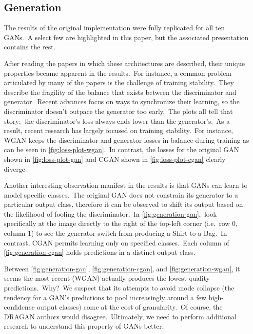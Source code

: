 \documentclass[conference]{IEEEtran}
\begin{document}
    \subsection{Generation}\label{subsec:results-generation}

    The results of the original implementation were fully replicated for all ten GANs.\ A select few are highlighted in this paper, but the associated presentation contains the rest.

    After reading the papers in which these architectures are described, their unique properties became apparent in the results.\ For instance, a common problem articulated by many of the papers is the challenge of training stability.\ They describe the fragility of the balance that exists between the discriminator and generator.\ Recent advances focus on ways to synchronize their learning, so the discriminator doesn't outpace the generator too early.\ The plots all tell that story;\ the discriminator's loss always ends lower than the generator's.\ As a result, recent research has largely focused on training stability.\ For instance, WGAN keeps the discriminator and generator losses in balance during training as can be seen in \autoref{fig:loss-plot-wgan}.\ In contrast, the losses for the original GAN shown in \autoref{fig:loss-plot-gan} and CGAN shown in \autoref{fig:loss-plot-cgan} clearly diverge.

    Another interesting observation manifest in the results is that GANs can learn to model specific classes.\ The original GAN does not constrain its generator to a particular output class, therefore it can be observed to shift its output based on the likelihood of fooling the discriminator.\ In \autoref{fig:generation-gan},\ look specifically at the image directly to the right of the top-left corner (i.e.\ row 0, column 1) to see the generator switch from producing a Shirt to a Bag.\ In contrast, CGAN permits learning only on specified classes.\ Each column of \autoref{fig:generation-cgan} holds predictions in a distinct output class.

    Between \autoref{fig:generation-gan}, \autoref{fig:generation-cgan}, and \autoref{fig:generation-wgan}, it seems the most recent (WGAN) actually produces the lowest quality predictions.\ Why?\ We suspect that its attempts to avoid mode collapse (the tendency for a GAN's predictions to pool increasingly around a few high-confidence output classes) come at the cost of granularity.\ Of course, the DRAGAN authors would disagree.\ Ultimately, we need to perform additional research to understand this property of GANs better.
\end{document}
